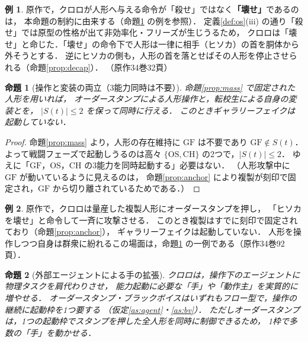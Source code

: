 \documentclass[a4paper,12pt]{jarticle}
\theoremstyle{definition}
\theoremstyle{plain}
\newtheorem{prop}{命題}
\theoremstyle{definition}
\newtheorem{ex}{例}
\theoremstyle{remark}
\newcommand{\Act}{S}   %
\newcommand{\GF}{\mathrm{GF}}    %
\newcommand{\OS}{\mathrm{OS}}    %
\newcommand{\CH}{\mathrm{CH}}    %
\begin{document}
\begin{ex}
原作で，クロロが人形へ与える命令が「殺せ」ではなく\textbf{「壊せ」}であるのは，
本命題の制約に由来する（命題\ref{prop:fight} の例を参照）．
定義\ref{def:os}(iii) の通り「殺せ」では原型の性格が出て非効率化・フリーズが生じうるため，
クロロは「壊せ」と命じた．「壊せ」の命令下で人形は一律に相手（ヒソカ）の首を胴体から外そうとする．
逆にヒソカの側も，人形の首を落とせばその人形を停止させられる（命題\ref{prop:decap}）．
（原作34巻32頁）
\end{ex}

\begin{prop}[操作と変装の両立（3能力同時は不要）]\label{prop:fight}
命題\ref{prop:mass} で固定された人形を用いれば，
オーダースタンプによる人形操作と，転校生による自身の変装とを，
$|\Act(t)|\le 2$ を保って同時に行える．
このとき{ギャラリーフェイクは起動していない}．
\end{prop}

\begin{proof}
命題\ref{prop:mass} より，人形の存在維持に $\GF$ は不要であり $\GF\notin\Act(t)$．
よって戦闘フェーズで起動しうるのは高々 $\{\OS,\CH\}$ の2つで，$|\Act(t)|\le2$．
ゆえに「$\GF$，$\OS$，$\CH$ の3能力を同時起動する」必要はない．
（人形攻撃中に $\GF$ が動いているように見えるのは，
命題\ref{prop:anchor} により複製が刻印で固定され，$\GF$ から{切り離されている}ためである．）
\end{proof}

\begin{ex}
原作で，クロロは量産した複製人形にオーダースタンプを押し，
「ヒソカを壊せ」と命令して一斉に攻撃させる．
このとき複製はすでに刻印で固定されており（命題\ref{prop:anchor}），
ギャラリーフェイクは起動していない．
人形を操作しつつ自身は群衆に紛れるこの場面は，命題\ref{prop:fight} の一例である（原作34巻92頁）．

\end{ex}

\begin{prop}[外部エージェントによる手の拡張]\label{prop:agent}
クロロは，操作下のエージェントに物理タスクを肩代わりさせ，
能力起動に必要な「手」や「動作主」を実質的に増やせる．
オーダースタンプ・ブラックボイスはいずれもフロー型で，操作の継続に起動枠を1つ要する
（仮定\ref{as:agent}・\ref{as:bv}）．
ただしオーダースタンプは，1つの起動枠で{スタンプを押した全人形を同時に}制御できるため，
1枠で多数の「手」を動かせる．
\end{prop}
\end{document}
